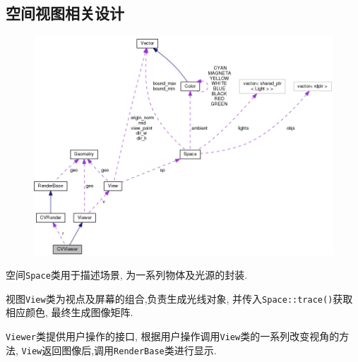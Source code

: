 \subsection{空间视图相关设计}
\begin{figure}[H]
  \centering
  \includegraphics[scale=0.4]{res/viewer_diagram.png}
\end{figure}
空间\verb|Space|类用于描述场景, 为一系列物体及光源的封装.

视图\verb|View|类为视点及屏幕的组合,负责生成光线对象,
并传入\verb|Space::trace()|获取相应颜色, 最终生成图像矩阵.

\verb|Viewer|类提供用户操作的接口,
根据用户操作调用\verb|View|类的一系列改变视角的方法,
\verb|View|返回图像后,调用\verb|RenderBase|类进行显示.
